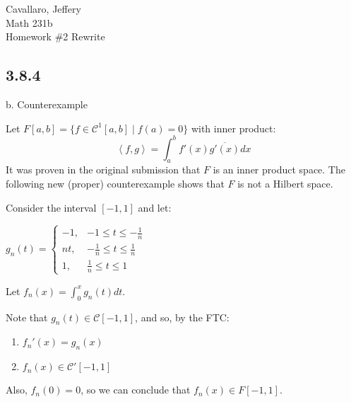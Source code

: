 \documentclass[letterpaper,12pt,fleqn]{article}
\newcommand{\mc}{\mathcal{C}}
\newcommand{\inner}[1]{\left<#1\right>}
\newcommand{\conj}[1]{\overline{#1}}
\begin{document}
Cavallaro, Jeffery \\
Math 231b \\
Homework \#2 Rewrite

\subsection*{3.8.4}

b. Counterexample

Let $F[a,b]=\{f\in\mc^1[a,b]\mid f(a)=0\}$ with inner product:
\[\inner{f,g}=\int_a^bf'(x)\conj{g'(x)}dx\]
It was proven in the original submission that $F$ is an inner product space.
The following new (proper) counterexample shows that $F$ is not a Hilbert
space.

Consider the interval $[-1,1]$ and let:

\begin{minipage}{3in}
  $g_n(t)=\begin{cases}
  -1, & -1\le t\le-\frac{1}{n} \\
  nt, & -\frac{1}{n}\le t\le\frac{1}{n} \\
  1, & \frac{1}{n}\le t\le1
  \end{cases}$
\end{minipage}
\begin{minipage}{3in}
\end{minipage}

Let $f_n(x)=\int_0^xg_n(t)dt$.

Note that $g_n(t)\in\mc[-1,1]$, and so, by the FTC:
\begin{enumerate}
  \item $f_n'(x)=g_n(x)$
  \item $f_n(x)\in\mc'[-1,1]$
\end{enumerate}

Also, $f_n(0)=0$, so we can conclude that $f_n(x)\in F[-1,1]$.
\end{document}
